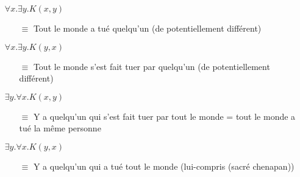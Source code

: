 \begin{frame}






\begin{itemize}
\item[] $\forall x. \exists y. K(x,y)$\pause
\begin{itemize}
\item[$\equiv$] Tout le monde a tué quelqu'un (de potentiellement différent)\pause
\end{itemize}
\item[] $\forall x. \exists y. K(y,x)$\pause
\begin{itemize}
\item[$\equiv$] Tout le monde s'est fait tuer par quelqu'un (de potentiellement différent)\pause
\end{itemize}
\item[] $\exists y. \forall x. K(x,y)$\pause
\begin{itemize}
\item[$\equiv$] Y a quelqu'un qui s'est fait tuer par tout le monde = tout le monde a tué la même personne\pause
\end{itemize}
\item[] $\exists y. \forall x. K(y,x)$\pause
\begin{itemize}
\item[$\equiv$] Y a quelqu'un qui a tué tout le monde (lui-compris (sacré chenapan))
\end{itemize}
\end{itemize}
\end{frame}
	


